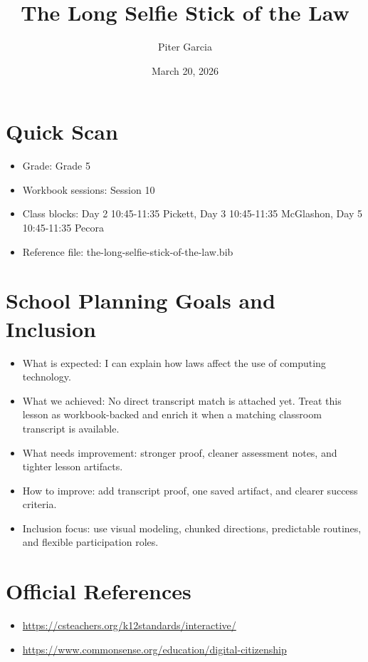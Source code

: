 \documentclass[11pt]{article}
\title{The Long Selfie Stick of the Law}
\author{Piter Garcia}
\date{March 20, 2026}
\begin{document}
    \maketitle
    \section*{Quick Scan}
    \begin{itemize}[leftmargin=*]
    \item Grade: Grade 5
    \item Workbook sessions: Session 10
    \item Class blocks: Day 2 10:45-11:35 Pickett, Day 3 10:45-11:35 McGlashon, Day 5 10:45-11:35 Pecora
    \item Reference file: the-long-selfie-stick-of-the-law.bib
    \end{itemize}
    \section*{School Planning Goals and Inclusion}
    \begin{itemize}[leftmargin=*]
    \item What is expected: I can explain how laws affect the use of computing technology.
    \item What we achieved: No direct transcript match is attached yet. Treat this lesson as workbook-backed and enrich it when a matching classroom transcript is available.
    \item What needs improvement: stronger proof, cleaner assessment notes, and tighter lesson artifacts.
    \item How to improve: add transcript proof, one saved artifact, and clearer success criteria.
    \item Inclusion focus: use visual modeling, chunked directions, predictable routines, and flexible participation roles.
    \end{itemize}
    \section*{Official References}
    \begin{itemize}[leftmargin=*]
    \item \url{https://csteachers.org/k12standards/interactive/}
\item \url{https://www.commonsense.org/education/digital-citizenship}

    \end{itemize}
    
\end{document}
